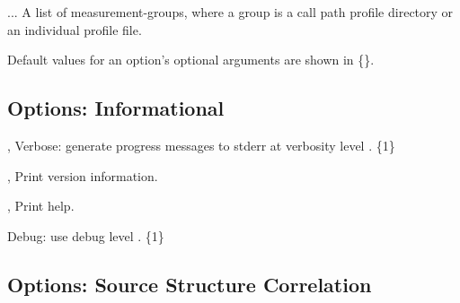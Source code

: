 \documentclass[english]{article}
\begin{document}
\begin{Description}
\item[\Arg{measurement-group}...] A list of measurement-groups, where a group is a call path profile directory or an individual profile file.
\end{Description}

Default values for an option's optional arguments are shown in \{\}.

\subsection{Options: Informational}

\begin{Description}
\item[\OptoArg{-v}{n}, \OptoArg{--verbose}{n}]
Verbose: generate progress messages to stderr at verbosity level .  \{1\} 
\item[\Opt{-V}, \Opt{--version}]
Print version information.

\item[\Opt{-h}, \Opt{--help}]
Print help.

\item[\OptoArg{--debug}{n}]
Debug: use debug level . \{1\}
\end{Description}

\subsection{Options: Source Structure Correlation}
\end{document}
